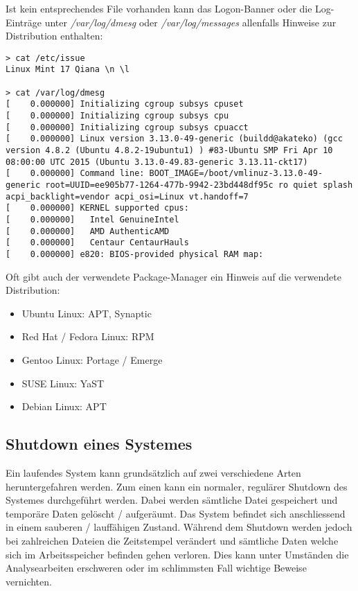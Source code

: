 Ist kein entsprechendes File vorhanden kann das Logon-Banner oder die Log-Einträge unter \textit{/var/log/dmesg} oder \textit{/var/log/messages} allenfalls Hinweise zur Distribution enthalten:\\
\begin{lstlisting}
> cat /etc/issue
Linux Mint 17 Qiana \n \l

> cat /var/log/dmesg
[    0.000000] Initializing cgroup subsys cpuset
[    0.000000] Initializing cgroup subsys cpu
[    0.000000] Initializing cgroup subsys cpuacct
[    0.000000] Linux version 3.13.0-49-generic (buildd@akateko) (gcc version 4.8.2 (Ubuntu 4.8.2-19ubuntu1) ) #83-Ubuntu SMP Fri Apr 10 08:00:00 UTC 2015 (Ubuntu 3.13.0-49.83-generic 3.13.11-ckt17)
[    0.000000] Command line: BOOT_IMAGE=/boot/vmlinuz-3.13.0-49-generic root=UUID=ee905b77-1264-477b-9942-23bd448df95c ro quiet splash acpi_backlight=vendor acpi_osi=Linux vt.handoff=7
[    0.000000] KERNEL supported cpus:
[    0.000000]   Intel GenuineIntel
[    0.000000]   AMD AuthenticAMD
[    0.000000]   Centaur CentaurHauls
[    0.000000] e820: BIOS-provided physical RAM map:
\end{lstlisting}

Oft gibt auch der verwendete Package-Manager ein Hinweis auf die verwendete Distribution:
\begin{itemize}
\item Ubuntu Linux: APT, Synaptic
\item Red Hat / Fedora Linux: RPM
\item Gentoo Linux: Portage / Emerge
\item SUSE Linux: YaST
\item Debian Linux: APT
\end{itemize}



\subsection{Shutdown eines Systemes}
Ein laufendes System kann grundsätzlich auf zwei verschiedene Arten heruntergefahren werden. Zum einen kann ein normaler, regulärer Shutdown des Systemes durchgeführt werden. Dabei werden sämtliche Datei gespeichert und temporäre Daten gelöscht / aufgeräumt. Das System befindet sich anschliessend in einem sauberen / lauffähigen Zustand. Während dem Shutdown werden jedoch bei zahlreichen Dateien die Zeitstempel verändert und sämtliche Daten welche sich im Arbeitsspeicher befinden gehen verloren. Dies kann unter Umständen die Analysearbeiten erschweren oder im schlimmsten Fall wichtige Beweise vernichten.

